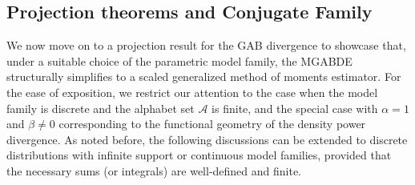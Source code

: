 \documentclass[11pt]{article}
\theoremstyle{plain}
\theoremstyle{remark}
\newcommand{\Acal}{\mathcal{A}}
\begin{document}
\subsection{Projection theorems and Conjugate Family}\label{sec:projection-theorems}

We now move on to a projection result for the GAB divergence to showcase that, under a suitable choice of the parametric model family, the MGABDE structurally simplifies to a scaled generalized method of moments estimator. For the ease of exposition, we restrict our attention to the case when the model family is discrete and the alphabet set $\Acal$ is finite, and the special case with $\alpha = 1$ and $\beta \neq 0$ corresponding to the functional geometry of the density power divergence. As noted before, the following discussions can be extended to discrete distributions with infinite support or continuous model families, provided that the necessary sums (or integrals) are well-defined and finite.
\end{document}
